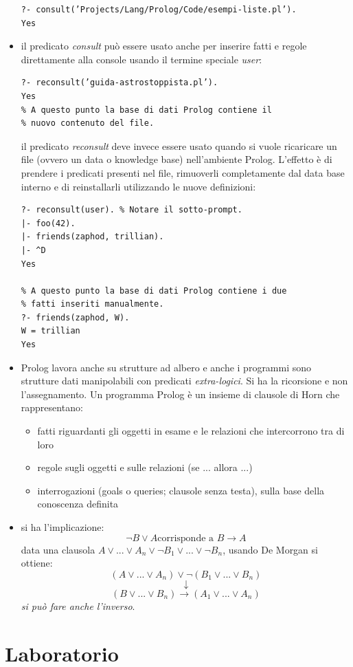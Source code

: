 \documentclass[a4paper,12pt, oneside]{book}
\begin{document}
\begin{itemize}
\begin{verbatim}
?- consult(’Projects/Lang/Prolog/Code/esempi-liste.pl’).
Yes
\end{verbatim}
\item il predicato \textit{consult} può essere usato anche per inserire fatti e regole direttamente alla console usando il termine speciale \textit{user}:
\begin{verbatim}
?- reconsult(’guida-astrostoppista.pl’).
Yes
% A questo punto la base di dati Prolog contiene il
% nuovo contenuto del file.
\end{verbatim}
il predicato \textit{reconsult} deve invece essere usato quando si vuole ricaricare un file (ovvero un data o knowledge base) nell'ambiente Prolog. L’effetto è di prendere i predicati presenti nel file, rimuoverli completamente dal data base interno e di reinstallarli utilizzando le nuove definizioni:
\begin{verbatim}
?- reconsult(user). % Notare il sotto-prompt.
|- foo(42).
|- friends(zaphod, trillian).
|- ^D
Yes

% A questo punto la base di dati Prolog contiene i due
% fatti inseriti manualmente.
?- friends(zaphod, W).
W = trillian
Yes
\end{verbatim}
\item Prolog lavora anche su strutture ad albero e anche i programmi sono strutture dati manipolabili con predicati \textit{extra-logici}. Si ha la ricorsione e non l'assegnamento. Un programma Prolog è un insieme di clausole di Horn che rappresentano:
\begin{itemize}
\item fatti riguardanti gli oggetti in esame e le relazioni che intercorrono tra di loro
\item regole sugli oggetti e sulle relazioni (se ... allora ...)
\item interrogazioni (goals o queries; clausole senza testa), sulla base della conoscenza definita
\end{itemize}
\item si ha l'implicazione: 
$$\neg B \vee A \mbox{corrisponde a } B\to A$$
data una clausola $A\vee ... \vee A_n\vee \neg B_1\vee ... \vee\neg B_n$, usando De Morgan si ottiene:
$$(A\vee ... \vee A_n)\vee \neg (B_1\vee ... \vee B_n)$$
$$\downarrow$$
$$(B\vee ... \vee B_n)\to (A_1\vee ... \vee A_n)$$
\textit{si può fare anche l'inverso}.\\
\end{itemize}
\chapter{Laboratorio}
\end{document}
